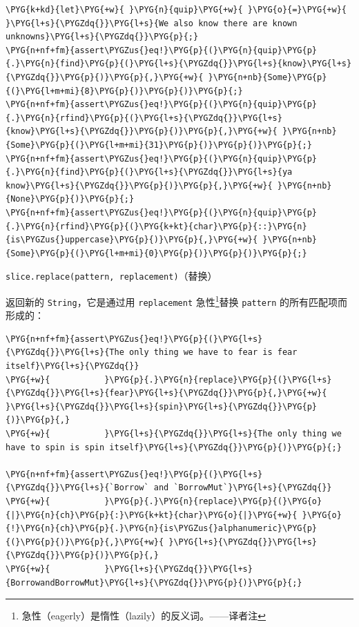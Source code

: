 \begin{Verbatim}[commandchars=\\\{\},breaklines=true,breakanywhere=true,fontsize=\codefont,xleftmargin=17bp]
\PYG{k+kd}{let}\PYG{+w}{ }\PYG{n}{quip}\PYG{+w}{ }\PYG{o}{=}\PYG{+w}{ }\PYG{l+s}{\PYGZdq{}}\PYG{l+s}{We also know there are known unknowns}\PYG{l+s}{\PYGZdq{}}\PYG{p}{;}
\PYG{n+nf+fm}{assert\PYGZus{}eq!}\PYG{p}{(}\PYG{n}{quip}\PYG{p}{.}\PYG{n}{find}\PYG{p}{(}\PYG{l+s}{\PYGZdq{}}\PYG{l+s}{know}\PYG{l+s}{\PYGZdq{}}\PYG{p}{)}\PYG{p}{,}\PYG{+w}{ }\PYG{n+nb}{Some}\PYG{p}{(}\PYG{l+m+mi}{8}\PYG{p}{)}\PYG{p}{)}\PYG{p}{;}
\PYG{n+nf+fm}{assert\PYGZus{}eq!}\PYG{p}{(}\PYG{n}{quip}\PYG{p}{.}\PYG{n}{rfind}\PYG{p}{(}\PYG{l+s}{\PYGZdq{}}\PYG{l+s}{know}\PYG{l+s}{\PYGZdq{}}\PYG{p}{)}\PYG{p}{,}\PYG{+w}{ }\PYG{n+nb}{Some}\PYG{p}{(}\PYG{l+m+mi}{31}\PYG{p}{)}\PYG{p}{)}\PYG{p}{;}
\PYG{n+nf+fm}{assert\PYGZus{}eq!}\PYG{p}{(}\PYG{n}{quip}\PYG{p}{.}\PYG{n}{find}\PYG{p}{(}\PYG{l+s}{\PYGZdq{}}\PYG{l+s}{ya know}\PYG{l+s}{\PYGZdq{}}\PYG{p}{)}\PYG{p}{,}\PYG{+w}{ }\PYG{n+nb}{None}\PYG{p}{)}\PYG{p}{;}
\PYG{n+nf+fm}{assert\PYGZus{}eq!}\PYG{p}{(}\PYG{n}{quip}\PYG{p}{.}\PYG{n}{rfind}\PYG{p}{(}\PYG{k+kt}{char}\PYG{p}{::}\PYG{n}{is\PYGZus{}uppercase}\PYG{p}{)}\PYG{p}{,}\PYG{+w}{ }\PYG{n+nb}{Some}\PYG{p}{(}\PYG{l+m+mi}{0}\PYG{p}{)}\PYG{p}{)}\PYG{p}{;}
\end{Verbatim}

\begin{myNote}
\texttt{slice.replace(pattern, replacement)}（替换）
\end{myNote}

返回新的 \texttt{String}，它是通过用 \texttt{replacement} 急性\footnote{急性（eagerly）是惰性（lazily）的反义词。——译者注}替换 \texttt{pattern} 的所有匹配项而形成的：

\begin{Verbatim}[commandchars=\\\{\},breaklines=true,breakanywhere=true,fontsize=\codefont,xleftmargin=17bp]
\PYG{n+nf+fm}{assert\PYGZus{}eq!}\PYG{p}{(}\PYG{l+s}{\PYGZdq{}}\PYG{l+s}{The only thing we have to fear is fear itself}\PYG{l+s}{\PYGZdq{}}
\PYG{+w}{           }\PYG{p}{.}\PYG{n}{replace}\PYG{p}{(}\PYG{l+s}{\PYGZdq{}}\PYG{l+s}{fear}\PYG{l+s}{\PYGZdq{}}\PYG{p}{,}\PYG{+w}{ }\PYG{l+s}{\PYGZdq{}}\PYG{l+s}{spin}\PYG{l+s}{\PYGZdq{}}\PYG{p}{)}\PYG{p}{,}
\PYG{+w}{           }\PYG{l+s}{\PYGZdq{}}\PYG{l+s}{The only thing we have to spin is spin itself}\PYG{l+s}{\PYGZdq{}}\PYG{p}{)}\PYG{p}{;}

\PYG{n+nf+fm}{assert\PYGZus{}eq!}\PYG{p}{(}\PYG{l+s}{\PYGZdq{}}\PYG{l+s}{`Borrow` and `BorrowMut`}\PYG{l+s}{\PYGZdq{}}
\PYG{+w}{           }\PYG{p}{.}\PYG{n}{replace}\PYG{p}{(}\PYG{o}{|}\PYG{n}{ch}\PYG{p}{:}\PYG{k+kt}{char}\PYG{o}{|}\PYG{+w}{ }\PYG{o}{!}\PYG{n}{ch}\PYG{p}{.}\PYG{n}{is\PYGZus{}alphanumeric}\PYG{p}{(}\PYG{p}{)}\PYG{p}{,}\PYG{+w}{ }\PYG{l+s}{\PYGZdq{}}\PYG{l+s}{\PYGZdq{}}\PYG{p}{)}\PYG{p}{,}
\PYG{+w}{           }\PYG{l+s}{\PYGZdq{}}\PYG{l+s}{BorrowandBorrowMut}\PYG{l+s}{\PYGZdq{}}\PYG{p}{)}\PYG{p}{;}
\end{Verbatim}

